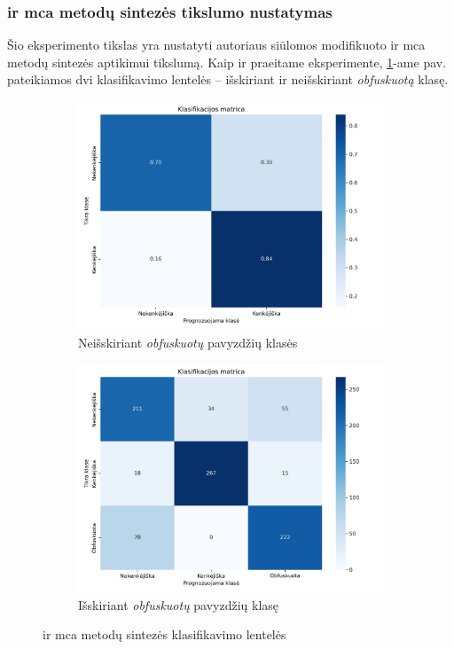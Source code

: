 \subsubsection{\LIME ir \gls{mca} metodų sintezės tikslumo nustatymas}

Šio eksperimento tikslas yra nustatyti autoriaus siūlomos modifikuoto \LIME ir \gls{mca} metodų sintezės  aptikimui tikslumą. Kaip ir praeitame eksperimente, \ref{fig:exp3:confusion}-ame pav. pateikiamos dvi klasifikavimo lentelės -- išskiriant ir neišskiriant \textit{obfuskuotą} klasę. 

\begin{figure}[h]
    \begin{subfigure}{0.5\textwidth}
        \centering
        \includegraphics[width=\textwidth]{images/synthesis_2x2.png}
        \caption{Neišskiriant \textit{obfuskuotų} pavyzdžių klasės}
    \end{subfigure}
    \begin{subfigure}{0.5\textwidth}
        \centering
        \includegraphics[width=\textwidth]{images/synthesis_3x3.png}
        \caption{Išskiriant \textit{obfuskuotų} pavyzdžių klasę}        
    \end{subfigure}
    \caption{\LIME ir \gls{mca} metodų sintezės klasifikavimo lentelės}
    \label{fig:exp3:confusion}
\end{figure}

